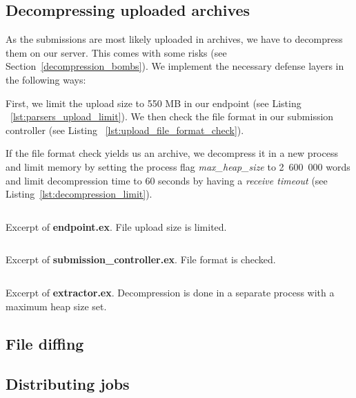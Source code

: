 \subsection*{Decompressing uploaded archives}

As the submissions are most likely uploaded in archives, we have to decompress them on our server. This comes with some risks (see Section~\ref{decompression_bombs}). We implement the necessary defense layers in the following ways:

First, we limit the upload size to 550 MB in our endpoint (see Listing ~\ref{lst:parsers_upload_limit}). We then check the file format in our submission controller (see Listing ~\ref{lst:upload_file_format_check}).


If the file format check yields us an archive, we decompress it in a new process and limit memory by setting the process flag \emph{max\_heap\_size} to 2~600~000 words and limit decompression time to 60 seconds by having a \emph{receive timeout} (see Listing~\ref{lst:decompression_limit}).

\begin{listing}
    \inputminted[firstline=43,lastline=46]{elixir}{code/server/lib/thesis_web/endpoint.ex}
    \caption{Excerpt of \textbf{endpoint.ex}. File upload size is limited.}
    \label{lst:parsers_upload_limit}
\end{listing}

\begin{listing}
    \inputminted[firstline=73,lastline=82]{elixir}{code/server/lib/thesis_web/controllers/submission_controller.ex}
    \caption{Excerpt of \textbf{submission\_controller.ex}. File format is checked.}
    \label{lst:upload_file_format_check}
\end{listing}

\begin{listing}
    \inputminted[firstline=77,lastline=100]{elixir}{code/server/lib/thesis/extractor.ex}
    \caption{Excerpt of \textbf{extractor.ex}. Decompression is done in a separate process with a maximum heap size set.}
    \label{lst:decompression_limit}
\end{listing}

\subsection{File diffing}

\subsection{Distributing jobs}

